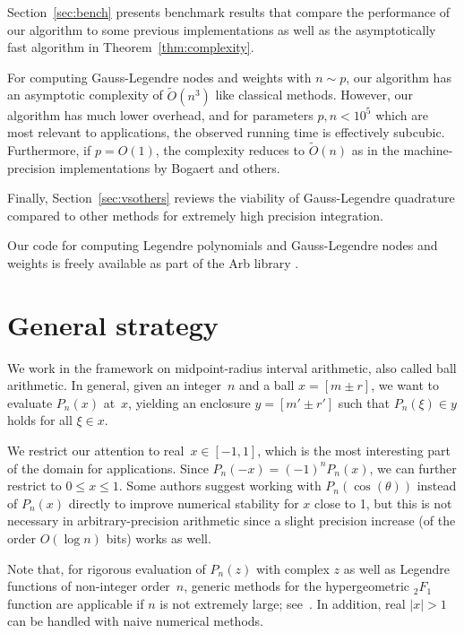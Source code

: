 \documentclass[11pt,a4paper]{article}
\begin{document}
Section~\ref{sec:bench} presents benchmark results
that compare the performance
of our algorithm
to some previous implementations
as well as the asymptotically fast algorithm in Theorem~\ref{thm:complexity}.

For computing Gauss-Legendre nodes and weights with $n \sim p$,
our algorithm has an asymptotic complexity of $\widetilde{O}(n^3)$ like
classical methods. However, our algorithm has much lower overhead,
and for parameters $p, n < 10^5$ which are most relevant to applications,
the observed running time is effectively subcubic.
Furthermore, if $p = O(1)$, the complexity reduces to $\widetilde{O}(n)$
as in the machine-precision implementations by Bogaert and others.

Finally, Section~\ref{sec:vsothers} reviews the viability of Gauss-Legendre
quadrature compared to other methods
for extremely high precision integration.

Our code for computing Legendre polynomials and
Gauss-Legendre nodes and weights is freely available as part of
the Arb library \cite{Johansson2017arb}.

\section{General strategy}

\label{sec:general}

We work in the framework on midpoint-radius interval arithmetic,
also called ball arithmetic.
In general, given an integer~$n$ and a ball $x = [m \pm r]$,
we want to evaluate $P_n(x)$ at~$x$,
yielding an enclosure $y = [m' \pm r']$ such that $P_n(\xi) \in y$
holds for all $\xi \in x$.

We restrict our attention to real~$x \in [-1, 1]$,
which is the most interesting part of the domain for applications.
Since $P_n(-x) = (-1)^n P_n(x)$, we can further
restrict to $0 \le x \le 1$.
Some authors suggest working with $P_n(\cos(\theta))$ instead of $P_n(x)$
directly to improve numerical stability for $x$ close to 1, but
this is not necessary in arbitrary-precision arithmetic since
a slight precision increase (of the order $O(\log n)$ bits)
works as well.

Note that, for rigorous evaluation of $P_n(z)$ with complex $z$
as well as Legendre functions of non-integer order $n$,
generic methods for the hypergeometric ${}_2F_1$ function
are applicable if $n$ is not extremely large; see~\cite{johansson2016hypergeometric}.
In addition, real $|x| > 1$ can be handled with naive numerical methods.
\end{document}
